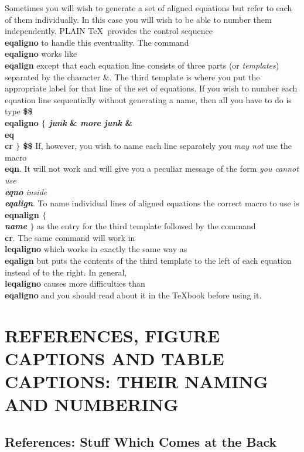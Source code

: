 Sometimes you will wish to generate a set of aligned equations
but refer to each of them individually.
In this case you will wish to be able to number them independently.
PLAIN \TeX\ provides the control sequence {\bf \\eqaligno}
to handle this eventuality.
The command {\bf \\eqaligno} works like {\bf \\eqalign}
except that each equation line consists of three
parts (or {\it templates\/}) separated by the character \&.
The third template is where you put the appropriate label for
that line of the set of equations.
If you wish to number each equation line sequentially without
generating a name, then all you have to do is type \nextline
{\bf \$\$  \\eqaligno $\{$ {\it junk} \& {\it more junk} \&
\\eq \\cr $\}$ \$\$ }\nextline
If, however, you wish to name each line separately
you {\it may not} use the macro {\bf \\eqn}.
It will not work and will give you a peculiar message of the form
{\it you cannot use {\bf \\eqno} inside {\bf \\eqalign}}.
To name individual lines of aligned equations the correct macro
to use is {\bf \\eqnalign $\{$ \\{\it name} $\}$ } as the
entry for the third template followed by the command {\bf \\cr}.
The same command will work in {\bf \\leqaligno} which works
in exactly the same way as {\bf \\eqalign} but puts the contents
of the third template to the left of each equation instead of to
the right.
In general, {\bf \\leqaligno} causes more difficulties than
{\bf \\eqaligno} and you should read about it in the \TeX book
before using it.
 
\chapter{REFERENCES, FIGURE CAPTIONS AND TABLE CAPTIONS:
THEIR NAMING AND NUMBERING }
 
\section{References: Stuff Which Comes at the Back}
 
